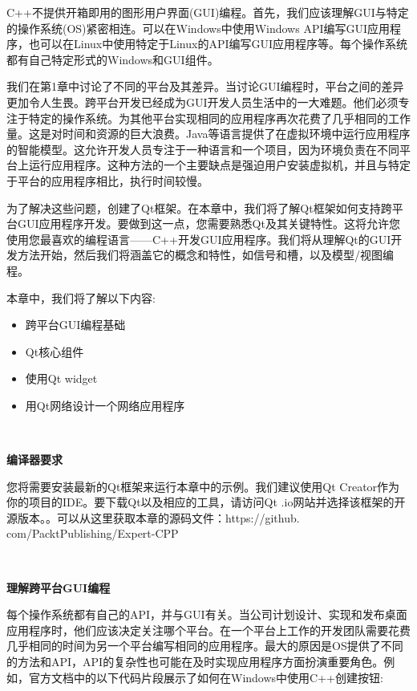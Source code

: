 C++不提供开箱即用的图形用户界面(GUI)编程。首先，我们应该理解GUI与特定的操作系统(OS)紧密相连。可以在Windows中使用Windows API编写GUI应用程序，也可以在Linux中使用特定于Linux的API编写GUI应用程序等。每个操作系统都有自己特定形式的Windows和GUI组件。 \par
我们在第1章中讨论了不同的平台及其差异。当讨论GUI编程时，平台之间的差异更加令人生畏。跨平台开发已经成为GUI开发人员生活中的一大难题。他们必须专注于特定的操作系统。为其他平台实现相同的应用程序再次花费了几乎相同的工作量。这是对时间和资源的巨大浪费。Java等语言提供了在虚拟环境中运行应用程序的智能模型。这允许开发人员专注于一种语言和一个项目，因为环境负责在不同平台上运行应用程序。这种方法的一个主要缺点是强迫用户安装虚拟机，并且与特定于平台的应用程序相比，执行时间较慢。 \par
为了解决这些问题，创建了Qt框架。在本章中，我们将了解Qt框架如何支持跨平台GUI应用程序开发。要做到这一点，您需要熟悉Qt及其关键特性。这将允许您使用您最喜欢的编程语言——C++开发GUI应用程序。我们将从理解Qt的GUI开发方法开始，然后我们将涵盖它的概念和特性，如信号和槽，以及模型/视图编程。 \par

本章中，我们将了解以下内容: \par

\begin{itemize}
	\item 跨平台GUI编程基础
	\item Qt核心组件
	\item 使用Qt widget
	\item 用Qt网络设计一个网络应用程序
\end{itemize}

\noindent\textbf{}\ \par
\textbf{编译器要求} \ \par
您将需要安装最新的Qt框架来运行本章中的示例。我们建议使用Qt Creator作为你的项目的IDE。要下载Qt以及相应的工具，请访问Qt .io网站并选择该框架的开源版本。。可以从这里获取本章的源码文件：https:/​/github.​com/PacktPublishing/Expert-CPP \par

\noindent\textbf{}\ \par
\textbf{理解跨平台GUI编程} \ \par
每个操作系统都有自己的API，并与GUI有关。当公司计划设计、实现和发布桌面应用程序时，他们应该决定关注哪个平台。在一个平台上工作的开发团队需要花费几乎相同的时间为另一个平台编写相同的应用程序。最大的原因是OS提供了不同的方法和API，API的复杂性也可能在及时实现应用程序方面扮演重要角色。例如，官方文档中的以下代码片段展示了如何在Windows中使用C++创建按钮: \par

